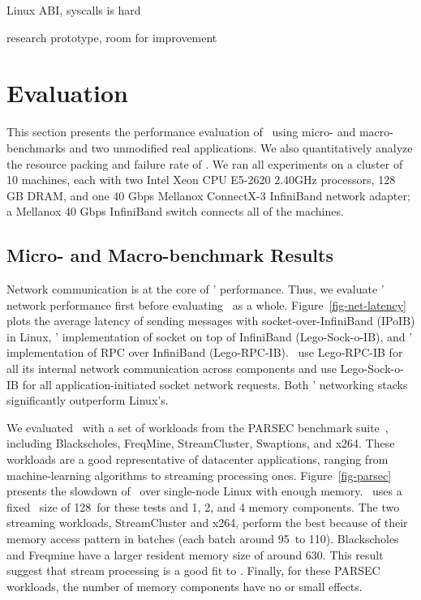 \documentclass[10pt,times,twocolumn]{z2-article}
\begin{document}
{{{{{{{Linux ABI, syscalls is hard

research prototype, room for improvement
\fi
%

\section{Evaluation}
\label{sec:results}

This section presents the performance evaluation of \lego\ using micro- and macro-benchmarks and two unmodified real applications.
We also quantitatively analyze the resource packing and failure rate of \lego.
We ran all experiments on a cluster of 10 machines, each with two Intel Xeon CPU E5-2620 2.40GHz
processors, 128 GB DRAM, and one 40 Gbps Mellanox ConnectX-3 InfiniBand network adapter;
a Mellanox 40 Gbps InfiniBand switch connects all of the machines. 

\subsection{Micro- and Macro-benchmark Results}
Network communication is at the core of \lego{}' performance.
Thus, we evaluate \lego{}' network performance first before evaluating \lego\ as a whole.
Figure~\ref{fig-net-latency} plots the average latency of sending messages with socket-over-InfiniBand (IPoIB) in Linux,
\lego{}' implementation of socket on top of InfiniBand (Lego-Sock-o-IB), and \lego{}' implementation of RPC over InfiniBand (Lego-RPC-IB).
\lego\ use Lego-RPC-IB for all its internal network communication across components and use Lego-Sock-o-IB for 
all application-initiated socket network requests.
Both \lego{}' networking stacks significantly outperform Linux's.

We evaluated \lego\ with a set of workloads from the PARSEC benchmark suite~\cite{PARSEC},
including Blackscholes, FreqMine, StreamCluster, Swaptions, and x264.
These workloads are a good representative of datacenter applications, 
ranging from machine-learning algorithms to streaming processing ones.
Figure~\ref{fig-parsec} presents the slowdown of \lego\ 
over single-node Linux with enough memory.
\lego\ uses a fixed \excache\ size of 128\MB\ for these tests and 1, 2, and 4 memory components.
The two streaming workloads, StreamCluster and x264, perform the best because of their 
memory access pattern in batches (each batch around 95\MB\ to 110\MB).
Blackscholes and Freqmine have a larger resident memory size of around 630\MB.
This result suggest that stream processing is a good fit to \lego.
Finally, for these PARSEC workloads, the number of memory components have no or small effects.

}}}}}}}
\end{document}
